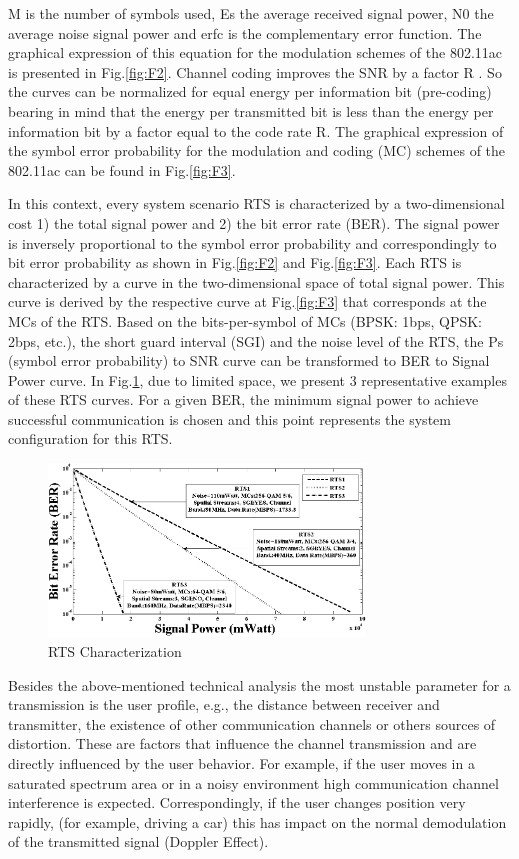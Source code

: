 M is the number of symbols used, Es the average received signal power, N0 the average noise signal power and erfc is the complementary error function.
	The graphical expression of this equation for the modulation schemes of the 802.11ac is presented in Fig.\ref{fig:F2}. Channel coding improves the SNR by a factor R \cite{18}. So the curves can be normalized for equal energy per information bit (pre-coding) bearing in mind that the energy per transmitted bit is less than the energy per information bit by a factor equal to the code rate R. The graphical expression of the symbol error probability for the modulation and coding (MC) schemes of the 802.11ac can be found in Fig.\ref{fig:F3}.
	
	In this context, every system scenario RTS is characterized by a two-dimensional cost 1) the total signal power and 2) the bit error rate (BER). The signal power is inversely proportional to the symbol error probability and correspondingly to bit error probability as shown in Fig.\ref{fig:F2} and Fig.\ref{fig:F3}. Each RTS is characterized by a curve in the two-dimensional space of total signal power. This curve is derived by the respective curve at Fig.\ref{fig:F3} that corresponds at the MCs of the RTS. Based on the bits-per-symbol of MCs (BPSK: 1bps, QPSK: 2bps, etc.), the short guard interval (SGI) and the noise level of the RTS, the Ps (symbol error probability) to SNR curve can be transformed to BER to Signal Power curve. In Fig.\ref{fig:F4}, due to limited space, we present 3 representative examples of these RTS curves. For a given BER, the minimum signal power to achieve successful communication is chosen and this point represents the system configuration for this RTS. 
	
\begin{figure}
\centering
\includegraphics[width=0.75\textwidth]{F/image8.png}
\caption{RTS Characterization}
\label{fig:F4}
\end{figure}	
	
	Besides the above-mentioned technical analysis the most unstable parameter for a transmission is the user profile, e.g., the distance between receiver and transmitter, the existence of other communication channels or others sources of distortion. These are factors that influence the channel transmission and are directly influenced by the user behavior. For example, if the user moves in a saturated spectrum area or in a noisy environment high communication channel interference is expected. Correspondingly, if the user changes position very rapidly, (for example, driving a car) this has impact on the normal demodulation of the transmitted signal (Doppler Effect). 
	
